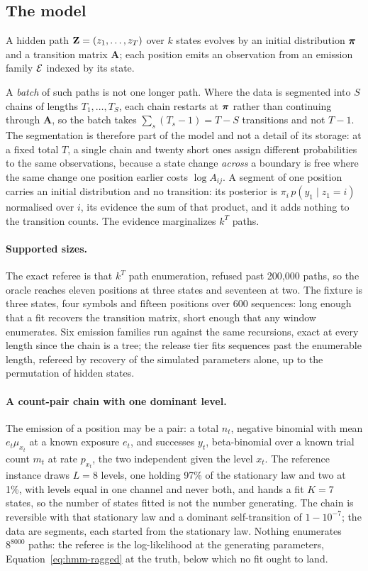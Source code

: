 \documentclass[11pt,a4paper]{article}
\begin{document}
\subsection{The model}
\label{sec:hmm:model}
A hidden path $\mathbf{Z} = (z_1, \dots, z_T)$ over $k$ states evolves by an
initial distribution $\boldsymbol{\pi}$ and a transition matrix $\mathbf{A}$; each position
emits an observation from an emission family $\mathcal{E}$ indexed by its state.

A \emph{batch} of such paths is not one longer path. Where the data is
segmented into $S$ chains of lengths $T_1, \dots, T_S$, each chain restarts at
$\boldsymbol{\pi}$ rather than continuing through $\mathbf{A}$, so the batch takes
$\sum_s (T_s - 1) = T - S$ transitions and not $T - 1$. The segmentation is
therefore part of the model and not a detail of its storage: at a fixed total
$T$, a single chain and twenty short ones assign different probabilities to the
same observations, because a state change \emph{across} a boundary is free
where the same change one position earlier costs $\log A_{ij}$. A segment of
one position carries an initial distribution and no transition: its posterior
is $\pi_i\, p(y_1 \mid z_1 = i)$ normalised over $i$, its evidence the sum
of that product, and it adds nothing to the transition counts.
The evidence marginalizes $k^T$ paths.

\paragraph{Supported sizes.}
\label{par:hmm:sizes}
The exact referee is that $k^T$ path enumeration, refused past 200,000 paths,
so the oracle reaches eleven positions at three states and seventeen at two.
The fixture is three states, four symbols and fifteen positions over 600
sequences: long enough that a fit recovers the transition matrix, short enough
that any window enumerates. Six emission families run against the same
recursions, exact at every length since the chain is a tree; the release tier
fits sequences past the enumerable length, refereed by recovery of the
simulated parameters alone, up to the permutation of hidden states.

\paragraph{A count-pair chain with one dominant level.}
\label{par:hmm:counts}
The emission of a position may be a pair: a total $n_t$, negative binomial
with mean $e_t \mu_{x_t}$ at a known exposure $e_t$, and successes $y_t$,
beta-binomial over a known trial count $m_t$ at rate $p_{x_t}$, the two
independent given the level $x_t$. The reference instance draws $L = 8$
levels, one holding 97\% of the stationary law and two at 1\%, with levels
equal in one channel and never both, and hands a fit $K = 7$ states, so the
number of states fitted is not the number generating. The chain is reversible
with that stationary law and a dominant self-transition of $1 - 10^{-7}$; the
data are segments, each started from the stationary law. Nothing enumerates
$8^{8000}$ paths: the referee is the log-likelihood at the generating
parameters, Equation~\ref{eq:hmm-ragged} at the truth, below which no fit
ought to land.
\end{document}
